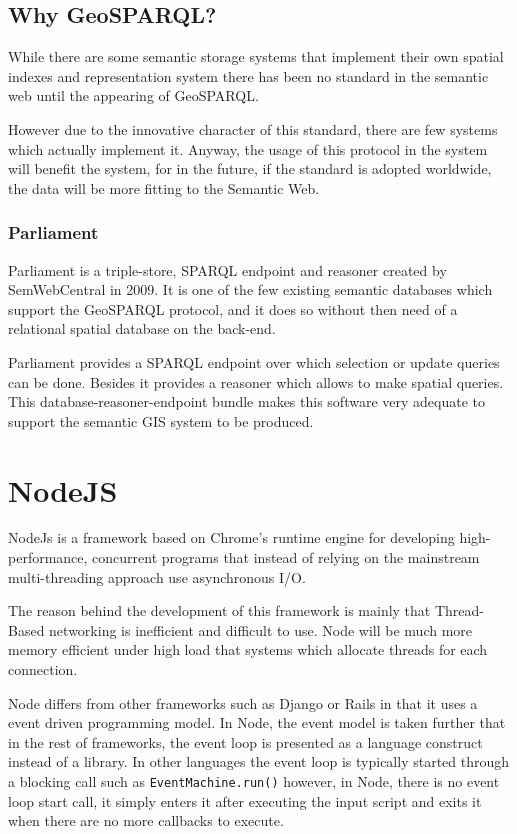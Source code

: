 \subsection*{Why GeoSPARQL?}

While there are some semantic storage systems that implement their own spatial indexes and representation system there has been no standard in the semantic web until the appearing of GeoSPARQL. 

However due to the innovative character of this standard, there are few systems which actually implement it. Anyway, the usage of this protocol in the system will benefit the system, for in the future, if the standard is adopted worldwide, the data will be more fitting to the Semantic Web.

\subsubsection*{Parliament}

Parliament\texttrademark\cite{parliament} is a triple-store, SPARQL endpoint and reasoner created by SemWebCentral in 2009. It is one of the few existing semantic databases which support the GeoSPARQL protocol, and it does so without then need of a relational spatial database on the back-end. 

Parliament provides a SPARQL endpoint over which selection or update queries can be done. Besides it provides a reasoner which allows to make spatial queries. This database-reasoner-endpoint bundle makes this software very adequate to support the semantic GIS system to be produced.

\section{NodeJS}

NodeJs is a framework based on Chrome's runtime engine\cite{v8} for developing high-performance, concurrent programs that instead of relying on the mainstream multi-threading approach use asynchronous I/O\cite{tilkov2010node}.

The reason behind the development of this framework is mainly that Thread-Based networking is inefficient and difficult to use. Node will be much more memory efficient under high load that systems which allocate threads for each connection.

Node differs from other frameworks such as Django or Rails in that it uses a event driven programming model. In Node, the event model is taken further that in the rest of frameworks, the event loop is presented as a language construct instead of a library. In other languages the event loop is typically started through a blocking call such as \texttt{EventMachine.run()} however, in Node, there is no event loop start call, it simply enters it after executing the input script and exits it when there are no more callbacks to execute.

